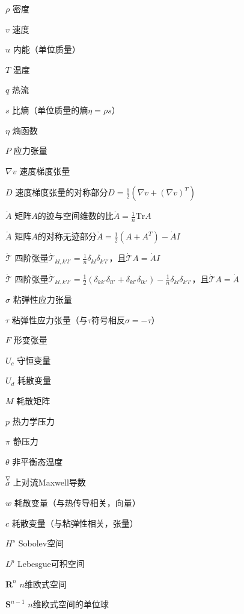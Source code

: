 \begin{denotation}[3cm]

\item[$\rho$] 密度
\item[$v$] 速度
\item[$u$] 内能（单位质量）
\item[$T$] 温度
\item[$q$] 热流
\item[$s$] 比熵（单位质量的熵$\eta = \rho s$）
\item[$\eta$] 熵函数
\item[$P$] 应力张量
\item[$\nabla v$] 速度梯度张量
\item[$D$] 速度梯度张量的对称部分$D = \frac{1}{2}(\nabla v + (\nabla v)^T)$
\item[$\dot{A}$] 矩阵$A$的迹与空间维数的比$\dot{A} = \frac{1}{n} \mbox{Tr} A$
\item[$\mathring{A}$] 矩阵$A$的对称无迹部分$\mathring{A} = \frac{1}{2}(A+A^T) - \dot{A}I$
\item[$\dot{\mathcal{T}}$] 四阶张量$\dot{\mathcal{T}}_{kl,k'l'} = \frac{1}{n}\delta_{kl} \delta_{k'l'}$，且$\dot{\mathcal{T}} A = \dot{A} I$
\item[$\mathring{\mathcal{T}}$] 四阶张量$\mathring{\mathcal{T}}_{kl,k'l'} =\frac{1}{2}(\delta_{kk'}\delta_{ll'} + \delta_{kl'} \delta_{lk'} ) -\frac{1}{n}\delta_{kl} \delta_{k'l'} $，且$\mathring{\mathcal{T}} A = \mathring{A}$
\item[$\sigma$] 粘弹性应力张量
\item[$\tau$] 粘弹性应力张量（与$\tau$符号相反$\sigma=-\tau$）
\item[$F$] 形变张量
\item[$U_c$] 守恒变量
\item[$U_d$] 耗散变量
\item[$M$] 耗散矩阵
\item[$p$] 热力学压力
\item[$\pi$] 静压力
\item[$\theta$] 非平衡态温度
\item[$\stackrel{\nabla} \sigma$] 上对流Maxwell导数
\item[$w$] 耗散变量（与热传导相关，向量）
\item[$c$] 耗散变量（与粘弹性相关，张量）
\item[$H^s$] Sobolev空间
\item[$L^p$] Lebesgue可积空间
\item[$\mathbf{R}^n$] $n$维欧式空间
\item[$\mathbf{S}^{n-1}$] $n$维欧式空间的单位球


\end{denotation}
